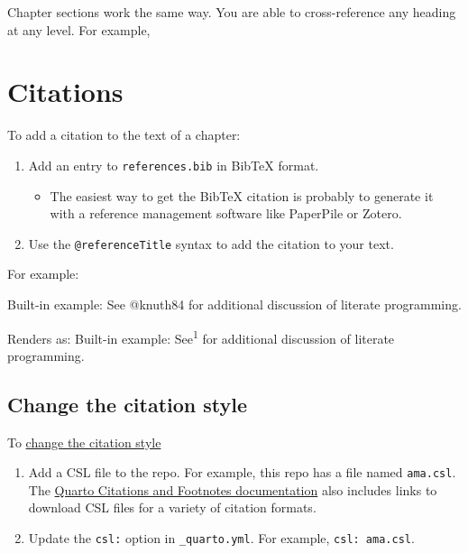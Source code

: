 \documentclass[
  letterpaper,
  DIV=11,
  numbers=noendperiod]{scrreprt}
\newenvironment{Shaded}{\begin{snugshade}}{\end{snugshade}}
\newcommand{\AnnotationTok}[1]{\textcolor[rgb]{0.37,0.37,0.37}{#1}}
\newcommand{\CommentTok}[1]{\textcolor[rgb]{0.37,0.37,0.37}{#1}}
\providecommand{\tightlist}{%
  \setlength{\itemsep}{0pt}\setlength{\parskip}{0pt}}\usepackage{longtable,booktabs,array}
\begin{document}
Chapter sections work the same way. You are able to cross-reference any
heading at any level. For example,

\section{Citations}\label{citations}

To add a citation to the text of a chapter:

\begin{enumerate}
\def\labelenumi{\arabic{enumi}.}
\tightlist
\item
  Add an entry to \texttt{references.bib} in BibTeX format.

  \begin{itemize}
  \tightlist
  \item
    The easiest way to get the BibTeX citation is probably to generate
    it with a reference management software like PaperPile or Zotero.
  \end{itemize}
\item
  Use the \texttt{@referenceTitle} syntax to add the citation to your
  text.
\end{enumerate}

For example:

\begin{Shaded}
\begin{Highlighting}[]
\AnnotationTok{Built{-}in example:}\CommentTok{ See @knuth84 for additional discussion of literate programming.}
\end{Highlighting}
\end{Shaded}

Renders as: Built-in example: See\textsuperscript{1} for additional
discussion of literate programming.

\subsection{Change the citation style}\label{change-the-citation-style}

To
\href{https://quarto.org/docs/authoring/footnotes-and-citations.html}{change
the citation style}

\begin{enumerate}
\def\labelenumi{\arabic{enumi}.}
\item
  Add a CSL file to the repo. For example, this repo has a file named
  \texttt{ama.csl}. The
  \href{https://quarto.org/docs/authoring/footnotes-and-citations.html}{Quarto
  Citations and Footnotes documentation} also includes links to download
  CSL files for a variety of citation formats.
\item
  Update the \texttt{csl:} option in \texttt{\_quarto.yml}. For example,
  \texttt{csl:\ ama.csl}.
\end{enumerate}
\end{document}
